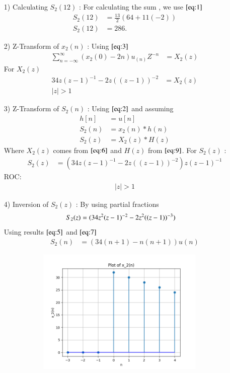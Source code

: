 \documentclass[journal,12pt,twocolumn]{IEEEtran}
\theoremstyle{remark}
\begin{document}
\begin{enumerate}
\item[1)] 
Calculating $S_2(12)$ :
For calculating the sum , we use $\eqref{eq:1}$
\begin{align}
 S_2{(12)} &= \frac{13}{2}(64+11(-2))\\
 S_2{(12)} &= 286.
 \end{align}

    \vspace{0.7cm}
\item[2)] 
Z-Transform of $x_2(n)$ :
Using $\eqref{eq:3}$
\vspace{0.05cm}
\begin{align}
\sum_{n=-\infty}^{\infty}(x_2(0) -2n)u_{(n)}Z^{-n} &= X_2(z)
\end{align}
For $X_2(z)$ 
\begin{align}
  34z(z-1)^{-1}-
       2z((z-1))^{-2} &= X_2(z) \label{eq:6}\\
    \lvert z\rvert  >  1 
\end{align}

\item[3)]
Z-Transform of $S_2(n)$ :
Using $\eqref{eq:2}$ and assuming 
\begin{align}
         h[n] &= u[n] \\
    S_2(n) &= x_2(n) * h(n) \\
    S_2(z) &= X_2(z) * H(z)
    \end{align}
    Where $X_2(z)$ comes from $\eqref{eq:6}$ and $H(z)$ from $\eqref{eq:9}$.
    \vspace{0.05cm}
    For $S_2(z)$ :
    \begin{align}
            S_2(z) &= (34z(z-1)^{-1}-
       2z((z-1))^{-2})z(z-1)^{-1}
    \end{align}
    ROC:
    \begin{align} 
    \lvert z \rvert > 1
    \end{align}
    
    \item[4)]
Inversion of $S_2(z)$ :
By using partial fractions 
\begin{align}
    S_2(z) &= \notag(34z^2(z-1)^{-2} - 2z^2((z-1))^{-3}) 
\end{align}
Using results $\eqref{eq:5}$ and $\eqref{eq:7}$
\begin{align}
 S_2(n) &= (34(n+1) - n(n+1))u(n)   
\end{align}

\begin{figure}[!ht]
\centering
  \graphicspath{ {figs/} }
\includegraphics[width=10cm, height=6cm]{graph_2}
\captionsetup{Graph:2 $x_2(n)$ vs n }
\label{graph:3}
\end{figure}


\end{enumerate}
\end{document}
